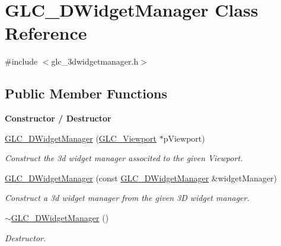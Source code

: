 \hypertarget{class_g_l_c__3_d_widget_manager}{\section{G\-L\-C\-\_\-D\-Widget\-Manager Class Reference}
\label{class_g_l_c__3_d_widget_manager}
}


{\ttfamily \#include $<$glc\-\_\-3dwidgetmanager.\-h$>$}

\subsection*{Public Member Functions}
\begin{Indent}{\bf Constructor / Destructor}\par
\begin{DoxyCompactItemize}
\item 
\hyperlink{class_g_l_c__3_d_widget_manager_a5b8e3d78dbe56af55f6c1091c9b0771d}{G\-L\-C\-\_\-D\-Widget\-Manager} (\hyperlink{class_g_l_c___viewport}{G\-L\-C\-\_\-\-Viewport} $\ast$p\-Viewport)
\begin{DoxyCompactList}\small\item\em Construct the 3d widget manager associted to the given Viewport. \end{DoxyCompactList}\item 
\hyperlink{class_g_l_c__3_d_widget_manager_a02bda18486af64ab464e2fe7048070e2}{G\-L\-C\-\_\-D\-Widget\-Manager} (const \hyperlink{class_g_l_c__3_d_widget_manager}{G\-L\-C\-\_\-D\-Widget\-Manager} \&widget\-Manager)
\begin{DoxyCompactList}\small\item\em Construct a 3d widget manager from the given 3\-D widget manager. \end{DoxyCompactList}\item 
\hyperlink{class_g_l_c__3_d_widget_manager_a416940d03773c5d413ea49bd1ff46d08}{$\sim$\-G\-L\-C\-\_\-D\-Widget\-Manager} ()
\begin{DoxyCompactList}\small\item\em Destructor. \end{DoxyCompactList}\end{DoxyCompactItemize}
\end{Indent}

